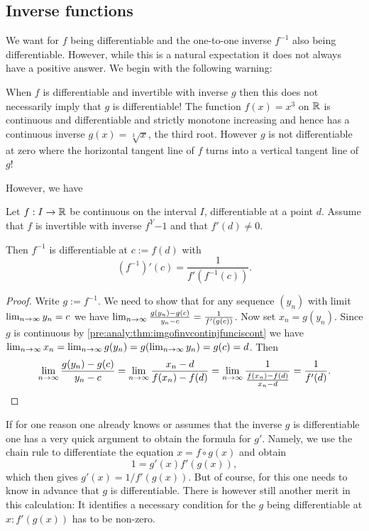 \documentclass[10pt, a4paper]{article}
\begin{document}
\subsection{Inverse functions}

We want for $f$ being differentiable and the one-to-one inverse $f ^ {-1}$ also being differentiable.
However,
while this is a natural expectation it does not always have a positive answer.
We begin with the following warning:

When $f$ is differentiable and invertible with inverse $g$ then this does not necessarily imply that $g$ is differentiable!
The function $f(x) = x ^ 3$ on $\mathbb{R}$ is continuous and differentiable and strictly monotone increasing and hence has a continuous inverse $g(x) = \sqrt[3]{x}$,
the third root.
However $g$ is not differentiable at zero where the horizontal tangent line of $f$ turns into a vertical tangent line of $g$!

However,
we have
\begin{proposition}
    Let $f : I \rightarrow \mathbb{R}$ be continuous on the interval $I$,
    differentiable at a point $d$.
    Assume that $f$ is invertible with inverse $f ^Y {-1}$ and that $f'(d) \neq 0$.

    Then $f ^ {-1}$ is differentiable at $c := f(d)$ with
    \[
    (f ^ {-1})'(c) = \frac{1}{f'(f ^ {-1}(c))}.
    \]
    \begin{proof}
        Write $g := f ^ {-1}$.
        We need to show that for any sequence $(y_n)$ with limit $\lim_{n \rightarrow \infty} y_n = c$ we have $\lim_{n \rightarrow \infty} \frac{g(y_n) - g(c)}{y_n - c} = \frac{1}{f'(g(c))}$.
        Now set $x_n = g(y_n)$.
        Since $g$ is continuous by \autoref{pre:analy:thm:imgofinvcontinjfunciscont} we have $\lim_{n \rightarrow \infty} x_n = \lim_{n \rightarrow \infty} g(y_n) = g(\lim_{n \rightarrow \infty} y_n) = g(c) = d$.
        Then
        \[
        \lim_{n \rightarrow \infty}\frac{g(y_n) - g(c)}{y_n - c} = \lim_{n \rightarrow \infty} \frac{x_n - d}{f(x_n) - f(d)} = \lim_{n \rightarrow \infty}\frac{1}{\frac{f(x_n) - f(d)}{x_n - d}} = \frac{1}{f'(d)}.
        \]
    \end{proof}
\end{proposition}

\begin{remark}
    If for one reason one already knows or assumes that the inverse $g$ is differentiable one has a very quick argument to obtain the formula for $g'$.
    Namely,
    we use the chain rule to differentiate the equation $x = f \circ g(x)$ and obtain
    \[
    1 = g'(x)f'(g(x)),
    \]
    which then gives $g'(x) = 1 / f'(g(x))$.
    But of course,
    for this one needs to know in advance that $g$ is differentiable.
    There is however still another merit in this calculation:
    It identifies a necessary condition for the $g$ being differentiable at $x: f'(g(x))$ has to be non-zero.
\end{remark}
\end{document}
